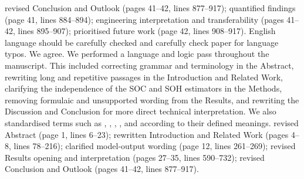 {} revised Conclusion and Outlook (pages 41--42, lines 877--917); quantified findings (page 41, lines 884--894); engineering interpretation and transferability (pages 41--42, lines 895--907); prioritised future work (page 42, lines 908--917).\markdownRendererInterblockSeparator
{}
\markdownRendererSectionEnd \markdownRendererSectionBegin
{}\markdownRendererInterblockSeparator
{}\markdownRendererBlockQuoteBegin
English language should be carefully checked and carefully check paper for language typos.\markdownRendererBlockQuoteEnd \markdownRendererInterblockSeparator
{} We agree. We performed a language and logic pass throughout the manuscript. This included correcting grammar and terminology in the Abstract, rewriting long and repetitive passages in the Introduction and Related Work, clarifying the independence of the SOC and SOH estimators in the Methods, removing formulaic and unsupported wording from the Results, and rewriting the Discussion and Conclusion for more direct technical interpretation. We also standardised terms such as , , , , and  according to their defined meanings.\markdownRendererParagraphSeparator
{} revised Abstract (page 1, lines 6--23); rewritten Introduction and Related Work (pages 4--8, lines 78--216); clarified model-output wording (page 12, lines 261--269); revised Results opening and interpretation (pages 27--35, lines 590--732); revised Conclusion and Outlook (pages 41--42, lines 877--917).
\markdownRendererSectionEnd 
\markdownRendererSectionEnd \markdownRendererDocumentEnd